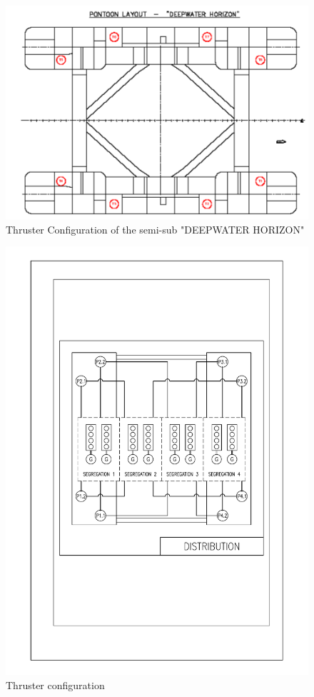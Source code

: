 \begin{figure}[h!]
    \centering
    \includegraphics[width = \textwidth ]{figures/PP_ThrusterConfig.png}
    \caption{Thruster Configuration of the semi-sub "DEEPWATER HORIZON" \cite{LectureNote11PowerSystemDesign}}
    \label{fig:PP_ThrusterConfigDeepwaterHorizon}
\end{figure}

\begin{figure}
    \centering
    \includegraphics[width = \textwidth]{figures/Single_Line_distribution.pdf}
    \caption{Thruster configuration}
    \label{fig:SingleLineDistribution}
\end{figure}

